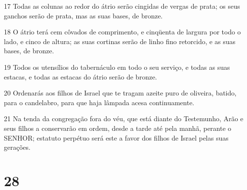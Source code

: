 \par 17 Todas as colunas ao redor do átrio serão cingidas de vergas de prata; os seus ganchos serão de prata, mas as suas bases, de bronze.
\par 18 O átrio terá cem côvados de comprimento, e cinqüenta de largura por todo o lado, e cinco de altura; as suas cortinas serão de linho fino retorcido, e as suas bases, de bronze.
\par 19 Todos os utensílios do tabernáculo em todo o seu serviço, e todas as suas estacas, e todas as estacas do átrio serão de bronze.
\par 20 Ordenarás aos filhos de Israel que te tragam azeite puro de oliveira, batido, para o candelabro, para que haja lâmpada acesa continuamente.
\par 21 Na tenda da congregação fora do véu, que está diante do Testemunho, Arão e seus filhos a conservarão em ordem, desde a tarde até pela manhã, perante o SENHOR; estatuto perpétuo será este a favor dos filhos de Israel pelas suas gerações.

\chapter{28}

